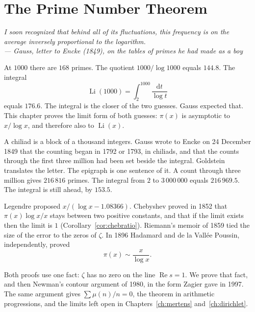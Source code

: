 \chapter{The Prime Number Theorem}\label{ch:pnt}

\begin{center}\itshape
I soon recognized that behind all of its fluctuations, this frequency is on the average inversely proportional to the logarithm.\\
\upshape --- Gauss, letter to Encke (1849), on the tables of primes he had made as a boy
\end{center}

At $1000$ there are $168$ primes. The quotient $1000/\log 1000$ equals $144.8$. The integral
\[
\operatorname{Li}(1000)=\int_2^{1000}\frac{\mathrm dt}{\log t}
\]
equals $176.6$. The integral is the closer of the two guesses. Gauss expected that. This chapter proves the limit form of both guesses: $\pi(x)$ is asymptotic to $x/\log x$, and therefore also to $\operatorname{Li}(x)$.

A chiliad is a block of a thousand integers. Gauss wrote to Encke on 24 December 1849 that the counting began in 1792 or 1793, in chiliads, and that the counts through the first three million had been set beside the integral. Goldstein translates the letter. The epigraph is one sentence of it. A count through three million gives $216\,816$ primes. The integral from $2$ to $3\,000\,000$ equals $216\,969.5$. The integral is still ahead, by $153.5$.

Legendre proposed $x/(\log x-1.08366)$. Chebyshev proved in 1852 that $\pi(x)\log x/x$ stays between two positive constants, and that if the limit exists then the limit is $1$ (Corollary~\ref{cor:chebratio}). Riemann's memoir of 1859 tied the size of the error to the zeros of $\zeta$. In 1896 Hadamard and de la Vallée Poussin, independently, proved
\[
\pi(x)\sim\frac x{\log x}.
\]

Both proofs use one fact: $\zeta$ has no zero on the line $\operatorname{Re}s=1$. We prove that fact, and then Newman's contour argument of 1980, in the form Zagier gave in 1997. The same argument gives $\sum\mu(n)/n=0$, the theorem in arithmetic progressions, and the limits left open in Chapters~\ref{ch:mertens} and~\ref{ch:dirichlet}.

